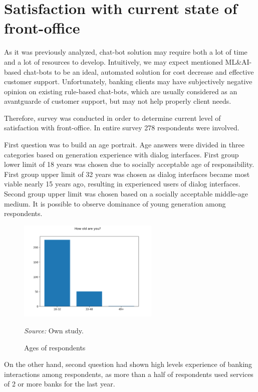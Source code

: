 
\section{Satisfaction with current state of front-office}

As it was previously analyzed, chat-bot solution may require both a lot of time and a lot of resources to develop.
Intuitively, we may expect mentioned ML\&AI-based chat-bots to be an ideal, automated solution for cost decrease and effective customer support.
Unfortunately, banking clients may have subjectively negative opinion on existing rule-based chat-bots, which are usually considered as an avantguarde of customer support, but may not help properly client needs.

Therefore, survey was conducted in order to determine current level of satisfaction with front-office.
In entire survey 278 respondents were involved.

First question was to build an age portrait. 
Age answers were divided in three categories based on generation experience with dialog interfaces.
First group lower limit of 18 years was chosen due to socially acceptable age of responsibility.
First group upper limit of 32 years was chosen as dialog interfaces became most viable nearly 15 years ago, resulting in experienced users of dialog interfaces.
Second group upper limit was chosen based on a socially acceptable middle-age medium. 
It is possible to observe dominance of young generation among respondents.

\begin{figure}
    \centering
    \includegraphics[width=0.6\textwidth,height=\textheight,keepaspectratio]{survey/1_how_old_are_you?.png}
    \caption{Ages of respondents}
    \medskip
    \footnotesize\textit{Source:} Own study.
\end{figure}

On the other hand, second question had shown high levels experience of banking interactions among respondents, as more than a half of respondents used services of 2 or more banks for the last year.

